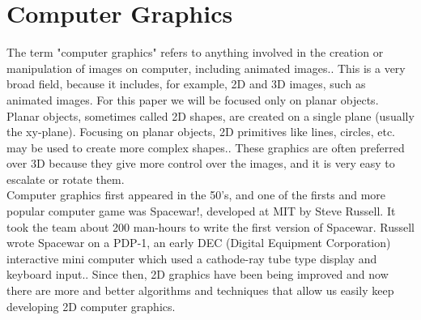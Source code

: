 \documentclass[conference]{IEEEtran}
\begin{document}
\section{Computer Graphics}
    The term "computer graphics" refers to anything involved in the creation or manipulation
of images on computer, including animated images.\cite{ComputerGraphics}. This is a very broad field, because it includes, for example, 2D and 3D images, such as animated images. For this paper we will be focused only on planar objects. Planar objects, sometimes called 2D shapes, are created on a single plane (usually the xy-plane). Focusing on planar objects, 2D primitives like lines, circles, etc. may be used to create more complex shapes.\cite{2DGraphics}. These graphics are often preferred over 3D because they give more control over the images, and it is very easy to escalate or rotate them.\\
Computer graphics first appeared in the 50's, and one of the firsts and more popular computer game was Spacewar!, developed at MIT by Steve Russell. It took the team about 200 man-hours to write the first version of Spacewar. Russell wrote Spacewar on a PDP-1, an early DEC (Digital Equipment Corporation) interactive mini computer which used a cathode-ray tube type display and keyboard input.\cite{SpaceWar}. Since then, 2D graphics have been being improved and now there are more and better algorithms and techniques that allow us easily keep developing 2D computer graphics.
\end{document}
